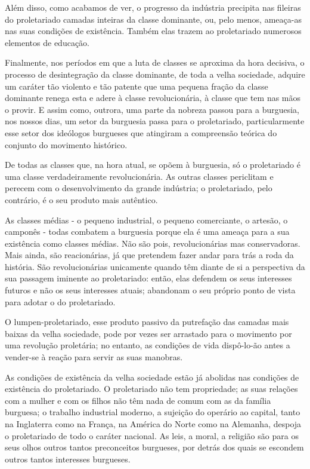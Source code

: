 Além disso, como acabamos de ver, o progresso da indústria precipita
nas fileiras do proletariado camadas inteiras da classe dominante, ou,
pelo menos, ameaça-as nas suas condições de existência. Também elas
trazem ao proletariado numerosos elementos de educação.

Finalmente, nos períodos em que a luta de classes se aproxima da hora
decisiva, o processo de desintegração da classe dominante, de toda a
velha sociedade, adquire um caráter tão violento e tão patente que uma
pequena fração da classe dominante renega esta e adere à classe
revolucionária, à classe que tem nas mãos o provir. E assim como,
outrora, uma parte da nobreza passou para a burguesia, nos nossos
dias, um setor da burguesia passa para o proletariado, particularmente
esse setor dos ideólogos burgueses que atingiram a compreensão teórica
do conjunto do movimento histórico.

De todas as classes que, na hora atual, se opõem à burguesia, só o
proletariado é uma classe verdadeiramente revolucionária. As outras
classes periclitam e perecem com o desenvolvimento da grande
indústria; o proletariado, pelo contrário, é o seu produto mais
autêntico.

As classes médias - o pequeno industrial, o pequeno comerciante, o
artesão, o camponês - todas combatem a burguesia porque ela é uma
ameaça para a sua existência como classes médias. Não são pois,
revolucionárias mas conservadoras. Mais ainda, são reacionárias, já
que pretendem fazer andar para trás a roda da história. São
revolucionárias unicamente quando têm diante de si a perspectiva da
sua passagem iminente ao proletariado: então, elas defendem os seus
interesses futuros e não os seus interesses atuais; abandonam o seu
próprio ponto de vista para adotar o do proletariado.

O lumpen-proletariado, esse produto passivo da putrefação das camadas
mais baixas da velha sociedade, pode por vezes ser arrastado para o
movimento por uma revolução proletária; no entanto, as condições de
vida dispô-lo-ão antes a vender-se à reação para servir as suas
manobras.

As condições de existência da velha sociedade estão já abolidas nas
condições de existência do proletariado. O proletariado não tem
propriedade; as suas relações com a mulher e com os filhos não têm
nada de comum com as da família burguesa; o trabalho industrial
moderno, a sujeição do operário ao capital, tanto na Inglaterra como
na França, na América do Norte como na Alemanha, despoja o
proletariado de todo o caráter nacional. As leis, a moral, a religião
são para os seus olhos outros tantos preconceitos burgueses, por
detrás dos quais se escondem outros tantos interesses burgueses.

